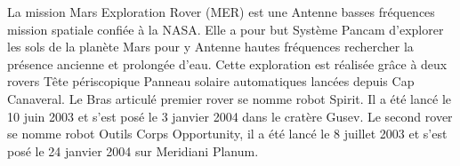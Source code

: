 \documentclass[10pt,fleqn]{article} %
\def\discipline{Sciences \\Industrielles de \\ l'Ingénieur}
\def\xxactivite{Colle 2}
\def\xxauteur{\textsl{Florestan Mathurin}}
\def\xxpied{%
Cycle 2 -- Analyse et Modélisation des SLCI \\
Ch. 3 : Réponses temporelles -- \xxactivite%
}
\begin{document}

\vspace{8cm}
\pagestyle{fancy}
\thispagestyle{plain}


\def\columnseprulecolor{\color{ocre}}
\setlength{\columnseprule}{0.4pt} 


\begin{multicols}{2}
%
%
%
%
%
%
%
%
%
%
%
%
%
%
%
%
%
%
%
%
%
%
%
%
%
%
%
%
%
%


La mission Mars Exploration Rover (MER) est une Antenne basses fréquences mission spatiale confiée à la NASA. Elle a pour but Système Pancam d’explorer les sols de la planète Mars pour y Antenne hautes fréquences rechercher la présence ancienne et prolongée d’eau.  Cette exploration est réalisée grâce à deux rovers Tête périscopique Panneau solaire automatiques lancées depuis Cap Canaveral. Le Bras articulé premier rover se nomme robot Spirit. Il a été lancé le 10 juin 2003 et s’est posé le 3 janvier 2004 dans le cratère Gusev. Le second rover se nomme robot Outils Corps Opportunity, il a été lancé le 8 juillet 2003 et s’est posé le 24 janvier 2004 sur Meridiani Planum. 
 

\end{multicols}
\end{document}
